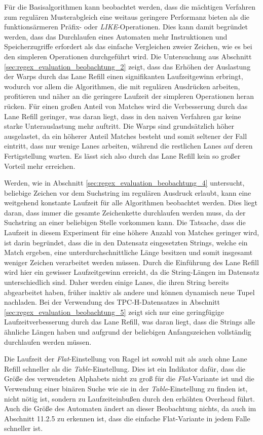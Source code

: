 Für die Basisalgorithmen kann beobachtet werden, dass die mächtigen Verfahren zum regulären Musterabgleich eine weitaus geringere Performanz bieten als die funktionsärmeren Präfix- oder \emph{LIKE}-Operationen.
Dies kann damit begründet werden, dass das Durchlaufen eines Automaten mehr Instruktionen und Speicherzugriffe erfordert als das einfache Vergleichen zweier Zeichen, wie es bei den simpleren Operationen durchgeführt wird.
Die Untersuchung aus Abschnitt \ref{sec:regex_evaluation_beobachtung_2} zeigt, dass das Erhöhen der Auslastung der Warps durch das Lane Refill einen signifikanten Laufzeitgewinn erbringt, wodurch vor allem die Algorithmen, die mit regulären Ausdrücken arbeiten, profitieren und näher an die geringere Laufzeit der simpleren Operationen heran rücken.
Für einen großen Anteil von Matches wird die Verbesserung durch das Lane Refill geringer, was daran liegt, dass in den naiven Verfahren gar keine starke Unterauslastung mehr auftritt.
Die Warps sind grundsätzlich höher ausgelastet, da ein höherer Anteil Matches besteht und somit seltener der Fall eintritt, dass nur wenige Lanes arbeiten, während die restlichen Lanes auf deren Fertigstellung warten.
Es lässt sich also durch das Lane Refill kein so großer Vorteil mehr erreichen.

Werden, wie in Abschnitt \ref{sec:regex_evaluation_beobachtung_4} untersucht, beliebige Zeichen vor dem Suchstring im regulären Ausdruck erlaubt, kann eine weitgehend konstante Laufzeit für alle Algorithmen beobachtet werden.
Dies liegt daran, dass immer die gesamte Zeichenkette durchlaufen werden muss, da der Suchstring an einer beliebigen Stelle vorkommen kann.
Die Tatsache, dass die Laufzeit in diesem Experiment für eine höhere Anzahl von Matches geringer wird, ist darin begründet, dass die in den Datensatz eingesetzten Strings, welche ein Match ergeben, eine unterdurchschnittliche Länge besitzen und somit insgesamt weniger Zeichen verarbeitet werden müssen.
Durch die Einführung des Lane Refill wird hier ein gewisser Laufzeitgewinn erreicht, da die String-Längen im Datensatz unterschiedlich sind.
Daher werden einige Lanes, die ihren String bereits abgearbeitet haben, früher inaktiv als andere und können dynamisch neue Tupel nachladen.
Bei der Verwendung des TPC-H-Datensatzes in Abschnitt \ref{sec:regex_evaluation_beobachtung_5} zeigt sich nur eine geringfügige Laufzeitverbesserung durch das Lane Refill, was daran liegt, dass die Strings alle ähnliche Längen haben und aufgrund der beliebigen Anfangszeichen vollständig durchlaufen werden müssen.

Die Laufzeit der \emph{Flat}-Einstellung von Ragel ist sowohl mit als auch ohne Lane Refill schneller als die \emph{Table}-Einstellung.
Dies ist ein Indikator dafür, dass die Größe des verwendeten Alphabets nicht zu groß für die \emph{Flat}-Variante ist und die Verwendung einer binären Suche wie sie in der \emph{Table}-Einstellung zu finden ist, nicht nötig ist, sondern zu Laufzeiteinbußen durch den erhöhten Overhead führt.
Auch die Größe des Automaten ändert an dieser Beobachtung nichts, da auch im Abschnitt 11.2.5 zu erkennen ist, dass die einfache Flat-Variante in jedem Falle schneller ist.
